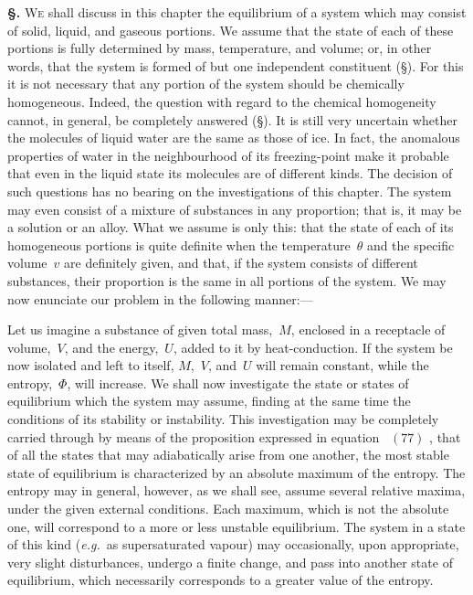 \documentclass[12pt]{book}[2005/09/16]
\newcommand{\Section}[1]{
  \medskip\par\textbf{§\;#1}
  \label{section:#1}
}
\newcommand{\SecRef}[2][§\;]{\hyperref[section:#2.]{{\upshape #1#2}}}
\newcommand{\Eq}[1]{%
  \hyperref[eqn:#1]{\ensuremath{#1}}%
}
\newcommand{\PageSep}[1]{\ignorespaces}
\newcommand{\eg}{\emph{e.g.}}
\newcommand{\First}[1]{\textsc{#1}}
\begin{document}
\Section{165.} \First{We} shall discuss in this chapter the equilibrium of
a system which may consist of solid, liquid, and gaseous
portions. We assume that the state of each of these
portions is fully determined by mass, temperature, and
volume; or, in other words, that the system is formed of
but one independent constituent (\SecRef{198}). For this it is not
necessary that any portion of the system should be chemically
homogeneous. Indeed, the question with regard to
the chemical homogeneity cannot, in general, be completely
answered (\SecRef{92}). It is still very uncertain whether the
molecules of liquid water are the same as those of ice. In
fact, the anomalous properties of water in the neighbourhood
of its freezing-point make it probable that even in
the liquid state its molecules are of different kinds. The
decision of such questions has no bearing on the investigations
of this chapter. The system may even consist of
a mixture of substances in any proportion; that is, it may
be a solution or an alloy. What we assume is only this:
that the state of each of its homogeneous portions is quite
definite when the temperature~$\theta$ and the specific volume~$v$
are definitely given, and that, if the system consists of
different substances, their proportion is the same in all
portions of the system. We may now enunciate our problem
in the following manner:---

Let us imagine a substance of given total mass,~$M$,
enclosed in a receptacle of volume,~$V$, and the energy,~$U$,
added to it by heat-conduction. If the system be now
isolated and left to itself, $M$,~$V$, and~$U$ will remain constant,
while the entropy,~$\Phi$, will increase. We shall now
\PageSep{133}
investigate the state or states of equilibrium which the
system may assume, finding at the same time the conditions
of its stability or instability. This investigation may be
completely carried through by means of the proposition
expressed in equation~\Eq{(77)}, that of all the states that may
adiabatically arise from one another, the most stable state
of equilibrium is characterized by an absolute maximum of
the entropy. The entropy may in general, however, as
we shall see, assume several relative maxima, under the
given external conditions. Each maximum, which is not
the absolute one, will correspond to a more or less unstable
equilibrium. The system in a state of this kind
(\eg\ as supersaturated vapour) may occasionally, upon
appropriate, very slight disturbances, undergo a finite
change, and pass into another state of equilibrium, which
necessarily corresponds to a greater value of the entropy.
\end{document}
